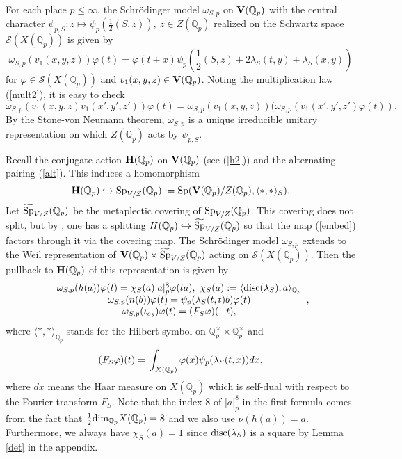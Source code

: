\documentclass[11pt]{amsart}
\numberwithin{equation}{section}
\theoremstyle{definition}
\begin{document}
For each place $p\le \infty$, the Schr\"odinger model $\omega_{S,p}$ on $\bold V({\mathbb{Q}}_p)$ 
with the central character $\psi_{p,S}:z\mapsto \psi_p(\frac{1}{2}(S,z)),\ z\in Z({\mathbb{Q}}_p)$ realized on the Schwartz space $\mathcal{S}(X({\mathbb{Q}}_p))$ is given by 
$$\omega_{S,p}(v_1(x,y,z))\varphi(t)=\varphi(t+x)\psi_p(\frac{1}{2}(S,z)+2\lambda_S(t,y)+\lambda_S(x,y))$$
for $\varphi\in \mathcal{S}(X({\mathbb{Q}}_p))$ and $v_1(x,y,z)\in \bold V({\mathbb{Q}}_p)$. 
Noting the multiplication law (\ref{mult2}), it is easy to check 
$$\omega_{S,p}(v_1(x,y,z)v_1(x',y',z'))\varphi(t)=\omega_{S,p}(v_1(x,y,z))(\omega_{S,p}(v_1(x',y',z')\varphi(t)).
$$ 
By the Stone-von Neumann theorem, $\omega_{S,p}$ is a unique irreducible unitary representation on which 
$Z({\mathbb{Q}}_p)$ acts by $\psi_{p,S}$. 

Recall the conjugate action $\bold H({\mathbb{Q}}_p)$ on $\bold V({\mathbb{Q}}_p)$ (see (\ref{h2})) and the alternating pairing (\ref{alt}). This induces a homomorphism 
\begin{equation}\label{embed}
\bold H({\mathbb{Q}}_p)\hookrightarrow {\rm Sp}_{V/Z}({\mathbb{Q}}_p):={\rm Sp}(\bold V({\mathbb{Q}}_p)/Z({\mathbb{Q}}_p),\langle \ast,\ast\rangle_S).
\end{equation}
Let $\widetilde{{\rm Sp}}_{V/Z}({\mathbb{Q}}_p)$ be the metaplectic covering of ${\rm Sp}_{V/Z}({\mathbb{Q}}_p)$. This covering does not 
split, but by \cite{kudla-split}, one has  
a splitting  $H({\mathbb{Q}}_p)\hookrightarrow  \widetilde{{\rm Sp}}_{V/Z}({\mathbb{Q}}_p)$ so that  
the map (\ref{embed}) factors through it via the covering map.  
The Schr\"odinger model $\omega_{S,p}$ extends to the Weil representation of $\bold V({\mathbb{Q}}_p)\rtimes \widetilde{{\rm Sp}}_{V/Z}({\mathbb{Q}}_p)$ 
acting on $\mathcal{S}(X({\mathbb{Q}}_p))$. 
Then the pullback to $\bold H({\mathbb{Q}}_p)$ of this representation is given by 
$$\begin{array}{c}
\omega_{S,p}(h(a))\varphi(t)=\chi_S(a)|a|^8_p\varphi(ta),\ \chi_S(a):=\langle {{\rm disc}}(\lambda_S),a \rangle_{{\mathbb{Q}}_p}\\ 
\omega_{S,p}(n(b))\varphi(t)=\psi_{p}(\lambda_S(t,t)b)\varphi(t) \\
\omega_{S,p}(\iota_{e_3})\varphi(t)=(F_S\varphi)(-t),
\end{array},
$$
where $\langle \ast,\ast \rangle_{{\mathbb{Q}}_p}$ stands for the Hilbert symbol on ${\mathbb{Q}}^\times_p\times {\mathbb{Q}}^\times_p$ and  
$$(F_S\varphi)(t)={\displaystyle}\int_{X({\mathbb{Q}}_p)} \varphi(x)\psi_p(\lambda_S(t,x))dx,
$$ 
where $dx$ means the Haar measure on $X({\mathbb{Q}}_p)$ which is self-dual with respect to the Fourier transform $F_S$. 
Note that the index $8$ of $|a|^8_p$ in the first formula comes from the fact that $\frac{1}{2}{\rm dim}_{{\mathbb{Q}}_p}X({\mathbb{Q}}_p)=8$ and 
we also use $\nu(h(a))=a$. Furthermore, we always have $\chi_S(a)=1$ since ${{\rm disc}}(\lambda_S)$ is a square 
by Lemma \ref{det} in the appendix. 
\end{document}
